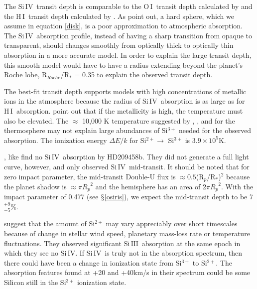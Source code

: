 \documentclass[twocolumn]{emulateapj}
\newcommand{\oi}{\ensuremath{\mathrm{O}\,\scriptstyle \mathrm{I}}}
\newcommand{\hi}{\ensuremath{\mathrm{H}\,\scriptstyle \mathrm{I}}}
\newcommand{\siIV}{\ensuremath{\mathrm{Si}\,\scriptstyle \mathrm{IV}}}
\newcommand{\siIII}{\ensuremath{\mathrm{Si}\,\scriptstyle \mathrm{III}}}
\newcommand{\p}{R$_p$/R$_*$}
\newcommand{\lya}{Lyman-$\alpha$}
\begin{document}
The \siIV\ transit depth is comparable to the \oi\ transit depth calculated by \citet{vidmad} and the \hi\ transit depth calculated by \citet{benjaf7}. As \citet{kosk} point out, a hard sphere, which we assume in equation \ref{disk}, is a poor approximation to atmospheric absorption. The \siIV\ absorption profile, instead of having a sharp transition from opaque to transparent, should changes smoothly from optically thick to optically thin absorption in a more accurate model. In order to explain the large transit depth, this smooth model would have to have a radius extending beyond the planet's Roche lobe, R$_{Roche}$/R$_*$ = 0.35 \citep{ben10} to explain the observed transit depth.

The best-fit transit depth supports models with high concentrations of metallic ions in the atmosphere because the radius of \siIV\ absorption is as large as for \hi\ absorption. \citet{kosk} point out that if the metallicity is high, the temperature must also be elevated. The $\approx$ 10,000 K temperature suggested by \citet{gmunoz}, \citet{mclay}, and \citet{kosk} for the thermosphere may not explain large abundances of Si$^{3+}$ needed for the observed absorption. The ionization energy $\Delta E/k$ for Si$^{2+} \rightarrow$ Si$^{3+}$ is $3.9 \times 10^5$K.


\citet{linsky}, like \citet{vidmad} find no \siIV\ absorption by HD209458b. They did not generate a full light curve, however, and only observed \siIV\ mid-transit. It should be noted that for zero impact parameter, the mid-transit Double-U flux is $\approx 0.5 $(\p)$^2$ because the planet shadow is $\approx \pi {R_p}^2$ and the hemisphere has an area of 2$\pi {R_p}^2$. With the impact parameter of 0.477 (see $\mathsection$\ref{osiris}), we expect the mid-transit depth to be  7$^{+9}_{-5}$\%. 

\citet{linsky} suggest that the amount of Si$^{2+}$ may vary appreciably over short timescales because of change in stellar wind speed, planetary mass-loss rate or temperature fluctuations. They observed significant \siIII\ absorption at the same epoch in which they see no \siIV. If \siIV\ is truly not in the absorption spectrum, then there could have been a change in ionization state from Si$^{3+}$ to Si$^{2+}$. The absorption features found at +20 and +40km/s in their spectrum could be some 
Silicon still in the Si$^{3+}$ ionization state.
\end{document}
